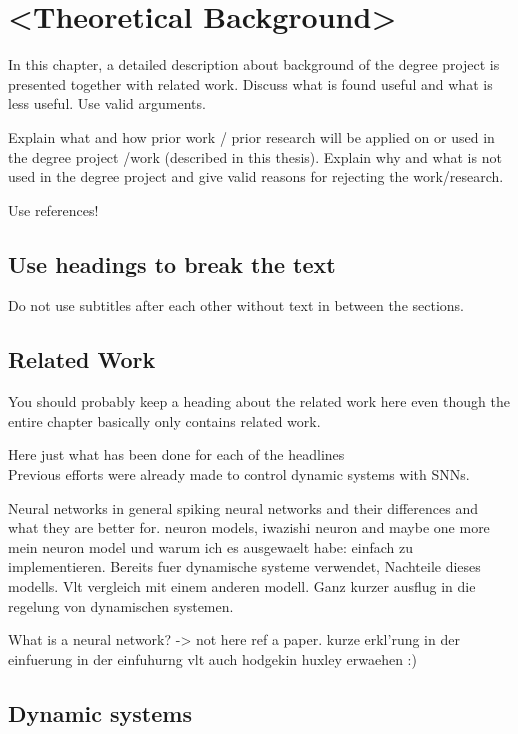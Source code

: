 \chapter{<Theoretical Background>}
In this chapter, a detailed description about background of the degree project is presented together with related work. Discuss what is found useful and what is less useful. Use valid arguments.

Explain what and how prior work / prior research will be applied on or used in the degree project /work (described in this thesis). Explain why and what is not used in the degree project and give valid reasons for rejecting the work/research.

Use references!

\section{Use headings to break the text}
Do not use subtitles after each other without text in between the sections.

\section{Related Work}
You should probably keep a heading about the related work here even though the entire chapter basically only contains related work.

Here just what has been done for each of the headlines\\
Previous efforts were already made to control dynamic systems with \acp{SNN}.




Neural networks in general
spiking neural networks and their differences and what they are better for.
neuron models, iwazishi neuron and maybe one more
mein neuron model und warum ich es ausgewaelt habe: einfach zu implementieren. Bereits fuer dynamische systeme verwendet,
Nachteile dieses modells.
Vlt vergleich mit einem anderen modell.
Ganz kurzer ausflug in die regelung von dynamischen systemen.


What is a neural network? -> not here ref a paper. kurze erkl'rung in der einfuerung
in der einfuhurng vlt auch hodgekin huxley erwaehen :)



\section{Dynamic systems}

